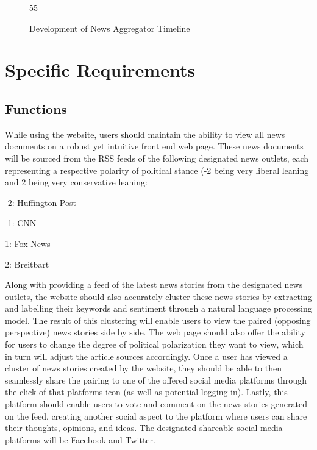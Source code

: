 \documentclass[onecolumn, draftclsnofoot,10pt, compsoc]{IEEEtran}
\begin{document}
\begin{figure}[h!]
    \begin{flushright}
        \begin{PstGanttChart}[unit=2,ChartShowIntervals,ChartUnitIntervalName=Month,ChartUnitBasicIntervalName=Month]{5}{5}
        \end{PstGanttChart}
        \caption{Development of News Aggregator Timeline}
        \label{fig:timeline}
    \end{flushright}
\end{figure}

\section{Specific Requirements}
\subsection{Functions}
While using the website, users should maintain the ability to view all news documents on a robust yet intuitive front end web page. These news documents will be sourced from the RSS feeds of the following designated news outlets, each representing a respective polarity of political stance (-2 being very liberal leaning and 2 being very conservative leaning:\par
-2: Huffington Post\par
-1: CNN\par
1: Fox News\par
2: Breitbart\par
Along with providing a feed of the latest news stories from the designated news outlets, the website should also accurately cluster these news stories by extracting and labelling their keywords and sentiment through a natural language processing model. The result of this clustering will enable users to view the paired (opposing perspective) news stories side by side. The web page should also offer the ability for users to change the degree of political polarization they want to view, which in turn will adjust the article sources accordingly. Once a user has viewed a cluster of news stories created by the website, they should be able to then seamlessly share the pairing to one of the offered social media platforms through the click of that platforms icon (as well as potential logging in). Lastly, this platform should enable users to vote and comment on the news stories generated on the feed, creating another social aspect to the platform where users can share their thoughts, opinions, and ideas. The designated shareable social media platforms will be Facebook and Twitter.
\end{document}
